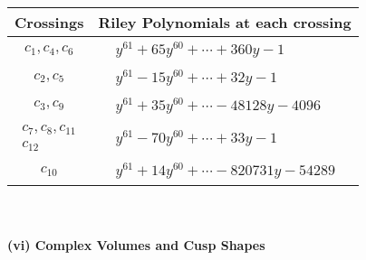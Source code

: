 \documentclass[1p]{elsarticle_modified}
\theoremstyle{definition}
\begin{document}
\begin{tabular}{m{50pt}|m{274pt}}
Crossings & \hspace{64pt}Riley Polynomials at each crossing \\
\hline $$\begin{aligned}c_{1},c_{4},c_{6}\end{aligned}$$&$\begin{aligned}
&y^{61}+65 y^{60}+\cdots+360 y-1
\end{aligned}$\\
\hline $$\begin{aligned}c_{2},c_{5}\end{aligned}$$&$\begin{aligned}
&y^{61}-15 y^{60}+\cdots+32 y-1
\end{aligned}$\\
\hline $$\begin{aligned}c_{3},c_{9}\end{aligned}$$&$\begin{aligned}
&y^{61}+35 y^{60}+\cdots-48128 y-4096
\end{aligned}$\\
\hline $$\begin{aligned}c_{7},c_{8},c_{11}\\c_{12}\end{aligned}$$&$\begin{aligned}
&y^{61}-70 y^{60}+\cdots+33 y-1
\end{aligned}$\\
\hline $$\begin{aligned}c_{10}\end{aligned}$$&$\begin{aligned}
&y^{61}+14 y^{60}+\cdots-820731 y-54289
\end{aligned}$\\
\hline
\end{tabular}\\~\\
\newpage\flushleft \textbf{(vi) Complex Volumes and Cusp Shapes}
\end{document}
